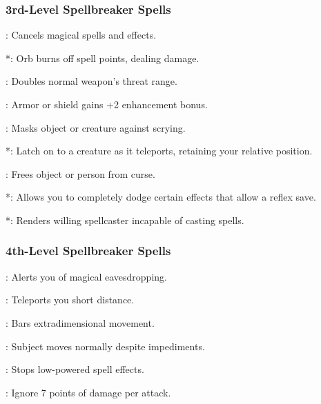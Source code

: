 \subsubsection{3rd-Level Spellbreaker Spells}
\begin{list}{}{\leftmargin=1em}
  \item {}: Cancels magical spells and effects.
  \item {}*: Orb burns off spell points, dealing damage.
  \item {}: Doubles normal weapon's threat range.
  \item {}: Armor or shield gains +2 enhancement bonus.
  \item {}: Masks object or creature against scrying.
  \item {}*: Latch on to a creature as it teleports, retaining your relative position.
  \item {}: Frees object or person from curse.
  \item {}*: Allows you to completely dodge certain effects that allow a reflex save.
  \item {}*: Renders willing spellcaster incapable of casting spells.
\end{list}
\subsubsection{4th-Level Spellbreaker Spells}
\begin{list}{}{\leftmargin=1em}
  \item {}: Alerts you of magical eavesdropping.
  \item {}: Teleports you short distance.
  \item {}: Bars extradimensional movement.
  \item {}: Subject moves normally despite impediments.
  \item {}: Stops low-powered spell effects.
  \item {}: Ignore 7 points of damage per attack.
\end{list}

